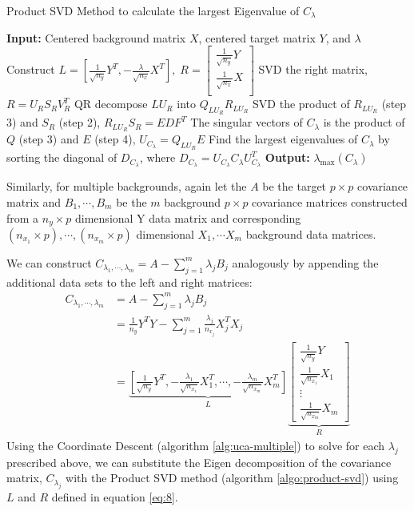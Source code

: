 \documentclass[12pt]{article}
\begin{document}
\begin{algorithm}[h]
\label{algo:product-svd}
\caption{Product SVD Method to calculate the largest Eigenvalue of $C_\lambda$}
\SetAlgoLined
\textbf{Input:} Centered background matrix $X$, centered target matrix $Y$, and $\lambda$\;
\nl Construct 
$  L = \left[ \frac{1}{\sqrt{n_{y}}}Y^T, - \frac{\lambda}{\sqrt{n_{x}}} X^T\right],\;
   R = \begin{bmatrix*} \frac{1}{\sqrt{n_{y}}}Y \\ \frac{1}{\sqrt{n_{x}}}X \\ \end{bmatrix*} $\;
\nl  SVD the right matrix, $R = U_R S_R V^T_R$ \;
\nl  QR decompose $LU_R$ into  $Q_{LU_R}R_{LU_R}$ \;
\nl  SVD the product of $R_{LU_R}$ (step 3) and $S_R$ (step 2), $R_{LU_R}S_{R} = EDF^T$ \;
\nl  The singular vectors of $C_\lambda$ is the product of $Q$ (step 3) and $E$ (step 4), $U_{C_\lambda} = Q_{LU_R}E$ \;
\nl  Find the largest eigenvalues of $C_\lambda$ by sorting the diagonal of $D_{C_\lambda}$, where $D_{C_\lambda} = U_{C_\lambda} C_\lambda U_{C_\lambda}^T$ \;
\textbf{Output:} $\lambda_{\text{max}}\left( C_\lambda \right)$ 
\end{algorithm}
 
Similarly, for multiple backgrounds, again let the $A$ be the target $p \times p$ covariance matrix and $ B_1, \cdots, B_m$ be the $m$ background $p \times p$ covariance matrices constructed from a $n_y \times p$ dimensional Y data matrix and corresponding $(n_{x_1} \times p), \cdots, (n_{x_m}\times p)$ dimensional $X_1, \cdots X_m$ background data matrices.

We can construct $C_{\lambda_1, \cdots, \lambda_m} = A - \sum^{m}_{j=1}\lambda_jB_j$ analogously by appending the additional data sets to the left and right matrices:
\begin{align}
C_{\lambda_1, \cdots, \lambda_m}&= A - \sum^{m}_{j=1}\lambda_jB_j \nonumber \\
&=\frac{1}{n_y}Y^{T}Y -\sum_{j=1}^{m}{\frac{\lambda_{j}}{n_{x_j}}X_{j}^TX_{j}} \nonumber\\
     &=  \underbrace{\left[\frac{1}{\sqrt{n_y}}Y^T, -\frac{\lambda_1}{\sqrt{n_{x_{1}}}} X^T_1, \cdots, -\frac{\lambda_m}{\sqrt{n_{x_{m}}}}X^T_m\right]}_{L} \underbrace{\begin{bmatrix} \frac{1}{\sqrt{n_{y}}}Y \\ \frac{1}{\sqrt{n_{x_{1}}}}X_1 \\ \vdots \\ \frac{1}{\sqrt{n_{x_{m}}}}X_m \end{bmatrix}}_{R} \label{eq:8}
\end{align}
Using the Coordinate Descent (algorithm \ref{alg:uca-multiple}) to solve for each $\lambda_j$ prescribed above, we can substitute the Eigen decomposition of the covariance matrix, $C_{\lambda_{j}}$ with the Product SVD method (algorithm \ref{algo:product-svd}) using $L$ and $R$ defined in equation \ref{eq:8}.
\end{document}
